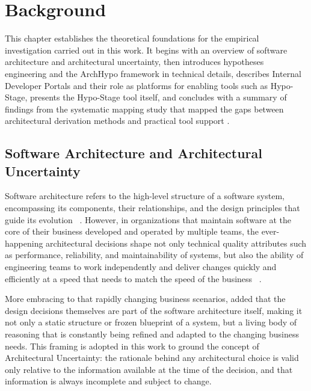 
\chapter{Background}
\label{cap:background}
\label{chap:background}
\label{ch:background}

This chapter establishes the theoretical foundations for the empirical investigation
carried out in this work. It begins with an overview of software architecture and
architectural uncertainty, then introduces hypotheses engineering and the ArchHypo framework in technical details, describes Internal
Developer Portals and their role as platforms for enabling tools such as Hypo-Stage,
presents the Hypo-Stage tool itself, and concludes with a summary of findings from the systematic mapping study that mapped the gaps between architectural derivation methods and practical tool support \citep{souza2019}.

\section{Software Architecture and Architectural Uncertainty}
\label{sec:sw-arch}

Software architecture refers to the high-level structure of a software system, encompassing its components, their relationships, and the design principles that guide
its evolution ~\citep{bass2021}. However, in organizations that maintain software at the core of their business developed and operated by multiple teams,
the ever-happening architectural decisions shape not only technical quality attributes such as performance, reliability, and maintainability of systems, 
but also the ability of engineering teams to work independently and deliver changes quickly and efficiently at a speed that needs to match the speed of the business ~\citep{skelton2019}.

More embracing to that rapidly changing business scenarios, \citet{richardsFord2020} added that the design decisions themselves are part of the software architecture itself, 
making it not only a static structure or frozen blueprint of a system, but a living body of reasoning that is constantly being refined and adapted to the changing business needs. 
This framing is adopted in this work to ground the concept of Architectural Uncertainty: the rationale behind any architectural choice is valid only relative to the information available at the time of the decision, 
and that information is always incomplete and subject to change.


